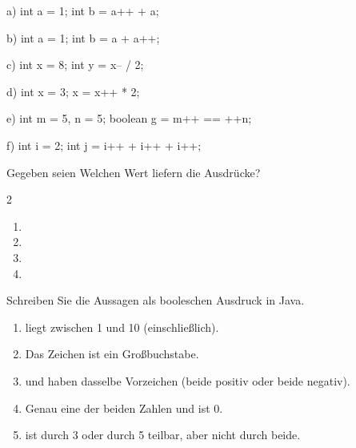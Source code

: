 \begin{tcbraster}[raster columns=3, raster equal height=rows, raster column skip=3mm, raster row skip=1mm]
\begin{javacode}[Ausschnitt]{a)}
int a = 1;
int b = a++ + a;
\end{javacode}
\begin{javacode}[Ausschnitt]{b)}
int a = 1;
int b = a + a++;
\end{javacode}
\begin{javacode}[Ausschnitt]{c)}
int x = 8;
int y = x-- / 2;
\end{javacode}
\begin{javacode}[Ausschnitt]{d)}
int x = 3;
x = x++ * 2;
\end{javacode}
\begin{javacode}[Ausschnitt]{e)}
int m = 5, n = 5;
boolean g = m++ == ++n;
\end{javacode}
\begin{javacode}[Ausschnitt]{f)}
int i = 2;
int j = i++ + i++ + i++;
\end{javacode}
\end{tcbraster}

Gegeben seien  Welchen Wert liefern die Ausdrücke?
\begin{multicols}{2}
\begin{enumerate}[label=\alph*)]
\item {}
\item {}
\item {}
\item {}
\end{enumerate}
\end{multicols}

Schreiben Sie die Aussagen als booleschen Ausdruck in Java.
\begin{enumerate}[label=\alph*)]
\item {} liegt zwischen 1 und 10 (einschließlich).
\item Das Zeichen  ist ein Großbuchstabe.
\item {} und  haben dasselbe Vorzeichen (beide positiv oder beide negativ).
\item Genau eine der beiden Zahlen  und  ist 0.
\item {} ist durch 3 oder durch 5 teilbar, aber nicht durch beide.
\end{enumerate}

